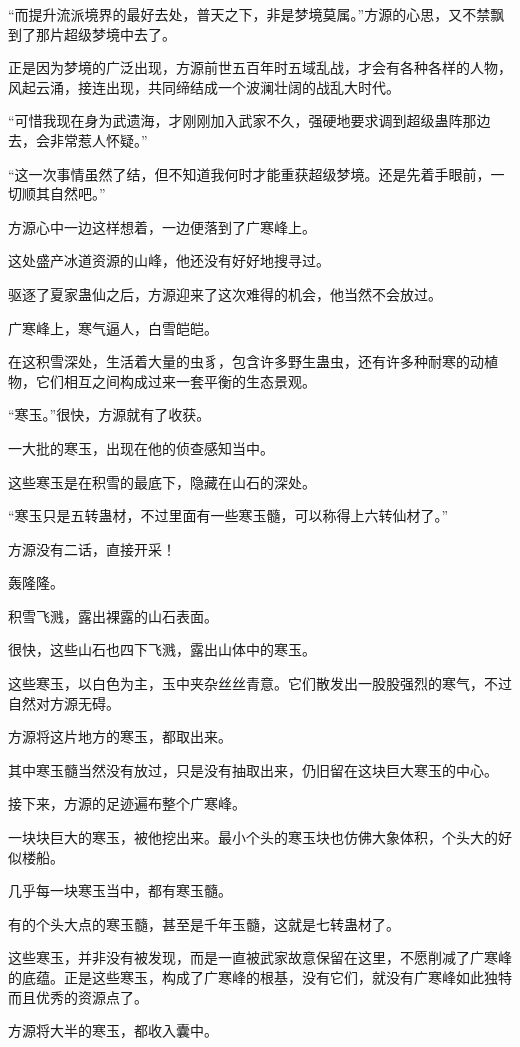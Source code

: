 \begin{this_body}
“而提升流派境界的最好去处，普天之下，非是梦境莫属。”方源的心思，又不禁飘到了那片超级梦境中去了。

正是因为梦境的广泛出现，方源前世五百年时五域乱战，才会有各种各样的人物，风起云涌，接连出现，共同缔结成一个波澜壮阔的战乱大时代。

“可惜我现在身为武遗海，才刚刚加入武家不久，强硬地要求调到超级蛊阵那边去，会非常惹人怀疑。”

“这一次事情虽然了结，但不知道我何时才能重获超级梦境。还是先着手眼前，一切顺其自然吧。”

方源心中一边这样想着，一边便落到了广寒峰上。

这处盛产冰道资源的山峰，他还没有好好地搜寻过。

驱逐了夏家蛊仙之后，方源迎来了这次难得的机会，他当然不会放过。

广寒峰上，寒气逼人，白雪皑皑。

在这积雪深处，生活着大量的虫豸，包含许多野生蛊虫，还有许多种耐寒的动植物，它们相互之间构成过来一套平衡的生态景观。

“寒玉。”很快，方源就有了收获。

一大批的寒玉，出现在他的侦查感知当中。

这些寒玉是在积雪的最底下，隐藏在山石的深处。

“寒玉只是五转蛊材，不过里面有一些寒玉髓，可以称得上六转仙材了。”

方源没有二话，直接开采！

轰隆隆。

积雪飞溅，露出裸露的山石表面。

很快，这些山石也四下飞溅，露出山体中的寒玉。

这些寒玉，以白色为主，玉中夹杂丝丝青意。它们散发出一股股强烈的寒气，不过自然对方源无碍。

方源将这片地方的寒玉，都取出来。

其中寒玉髓当然没有放过，只是没有抽取出来，仍旧留在这块巨大寒玉的中心。

接下来，方源的足迹遍布整个广寒峰。

一块块巨大的寒玉，被他挖出来。最小个头的寒玉块也仿佛大象体积，个头大的好似楼船。

几乎每一块寒玉当中，都有寒玉髓。

有的个头大点的寒玉髓，甚至是千年玉髓，这就是七转蛊材了。

这些寒玉，并非没有被发现，而是一直被武家故意保留在这里，不愿削减了广寒峰的底蕴。正是这些寒玉，构成了广寒峰的根基，没有它们，就没有广寒峰如此独特而且优秀的资源点了。

方源将大半的寒玉，都收入囊中。


\end{this_body}
